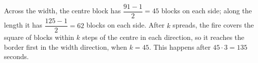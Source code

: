 Across the width, the centre block has $\dfrac{91-1}{2}=45$ blocks on each side; along the length it has $\dfrac{125-1}{2}=62$ blocks on each side. After $k$ spreads, the fire covers the square of blocks within $k$ steps of the centre in each direction, so it reaches the border first in the width direction, when $k=45$. This happens after $45\cdot3=\boxed{135}$ seconds.

